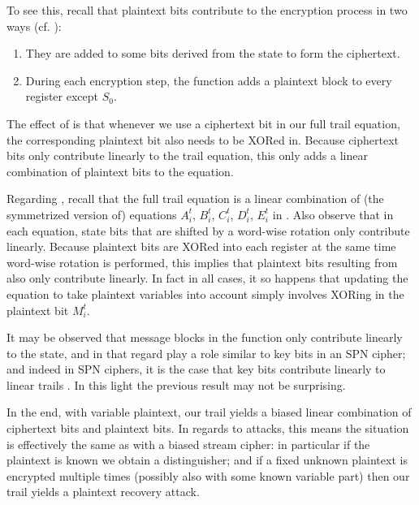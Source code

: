 To see this, recall that plaintext bits contribute to the encryption process in two ways (cf. ):
\begin{enumerate}
\item They are added to some bits derived from the state to form the ciphertext.\label{item:1}
\item During each encryption step, the \StateUpdate{} function adds a plaintext block to every register except $S_0$.\label{item:2}
\end{enumerate}

The effect of  is that whenever we use a ciphertext bit in our full trail equation, the corresponding plaintext bit also needs to be XORed in. Because ciphertext bits only contribute linearly to the trail equation, this only adds a linear combination of plaintext bits to the equation.

Regarding , recall that the full trail equation is a linear combination of (the symmetrized version of) equations $A^t_i$, $B^t_i$, $C^t_i$, $D^t_i$, $E^t_i$ in . Also observe that in each equation, state bits that are shifted by a word-wise rotation only contribute linearly. Because plaintext bits are XORed into each register at the same time word-wise rotation is performed, this implies that plaintext bits resulting from  also only contribute linearly.
In fact in all cases, it so happens that updating the equation to take plaintext variables into account simply involves XORing in the plaintext bit $M^t_i$.

It may be observed that message blocks in the \StateUpdate{} function only contribute linearly to the state, and in that regard play a role similar to key bits in an SPN cipher; and indeed in SPN ciphers, it is the case that key bits contribute linearly to linear trails \cite{eurocryptMatsui93}. In this light the previous result may not be surprising.

In the end, with variable plaintext, our trail yields a biased linear combination of ciphertext bits and plaintext bits.
In regards to attacks, this means the situation is effectively the same as with a biased stream cipher: in particular if the plaintext is known we obtain a distinguisher; and if a fixed unknown plaintext is encrypted multiple times (possibly also with some known variable part) then our trail yields a plaintext recovery attack.

